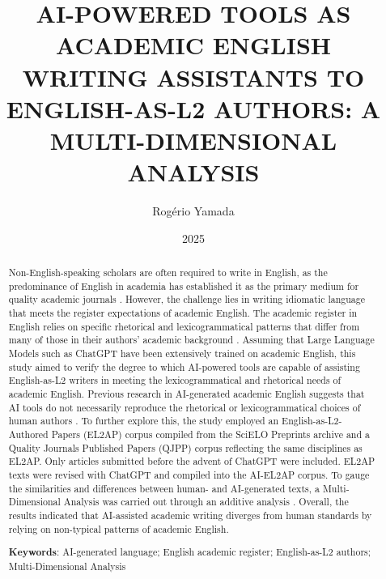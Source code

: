 \title{\Large \MakeUppercase{AI-Powered Tools as Academic English Writing Assistants to English-as-L2 Authors: A Multi-Dimensional Analysis}}
\author{Rogério Yamada} %
\date{2025}
\maketitle
\begin{abstract}
    Non-English-speaking scholars are often required to write in English, as the predominance of English in academia has established it as the primary medium for quality academic journals \citep{belcherSeekingAcceptanceEnglishonly2007, baumvolScholarlyPublicationBrazilian2021, flowerdewEnglishResearchPublication2012, cargillIntroductionSpecialIssue2008}. However, the challenge lies in writing idiomatic language that meets the register expectations of academic English. The academic register in English relies on specific rhetorical and lexicogrammatical patterns \citep{biberLexicalBundlesUniversity2007,adelRecurrentWordCombinations2012} that differ from many of those in their authors’ academic background \citep{adelRecurrentWordCombinations2012, pangLexicalBundlesConstruction2010, wrayConcludingQuestionWhy2019}. Assuming that Large Language Models such as ChatGPT have been extensively trained on academic English, this study aimed to verify the degree to which AI-powered tools are capable of assisting English-as-L2 writers in meeting the lexicogrammatical and rhetorical needs of academic English. Previous research in AI-generated academic English suggests that AI tools do not necessarily reproduce the rhetorical or lexicogrammatical choices of human authors \citep{berbersardinhaAIgeneratedHumanauthoredTexts2024}. To further explore this, the study employed an English-as-L2-Authored Papers (EL2AP) corpus compiled from the SciELO Preprints archive \citep{SciELOPreprints} and a Quality Journals Published Papers (QJPP) corpus reflecting the same disciplines as EL2AP. Only articles submitted before the advent of ChatGPT were included. EL2AP texts were revised with ChatGPT and compiled into the AI-EL2AP corpus. To gauge the similarities and differences between human- and AI-generated texts, a Multi-Dimensional Analysis \citep{biberVariationSpeechWriting1988, biberDimensionsRegisterVariation1995} was carried out through an additive analysis \citep{berbersardinhaAddingRegistersPrevious2019}. Overall, the results indicated that AI-assisted academic writing diverges from human standards by relying on non-typical patterns of academic English.

    \vspace{1em}
    \textbf{Keywords}: AI-generated language; English academic register; English-as-L2 authors; Multi-Dimensional Analysis
\end{abstract}


\listoffigures
\thispagestyle{empty}
\listoftables
\thispagestyle{empty}
\lstlistoflistings
\thispagestyle{empty}
\tableofcontents
\thispagestyle{empty}
\clearpage
{}
\setcounter{page}{16} %
